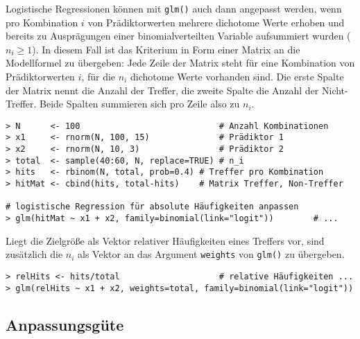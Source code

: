 Logistische Regressionen können mit \lstinline!glm()! auch dann angepasst werden, wenn pro Kombination $i$ von Prädiktorwerten mehrere dichotome Werte erhoben und bereits zu Ausprägungen einer binomialverteilten Variable aufsummiert wurden ($n_{i} \geq 1$). In diesem Fall ist das Kriterium in Form einer Matrix an die Modellformel zu übergeben: Jede Zeile der Matrix steht für eine Kombination von Prädiktorwerten $i$, für die $n_{i}$ dichotome Werte vorhanden sind. Die erste Spalte der Matrix nennt die Anzahl der Treffer, die zweite Spalte die Anzahl der Nicht-Treffer. Beide Spalten summieren sich pro Zeile also zu $n_{i}$.
\begin{lstlisting}
> N      <- 100                            # Anzahl Kombinationen
> x1     <- rnorm(N, 100, 15)              # Prädiktor 1
> x2     <- rnorm(N, 10, 3)                # Prädiktor 2
> total  <- sample(40:60, N, replace=TRUE) # n_i
> hits   <- rbinom(N, total, prob=0.4) # Treffer pro Kombination
> hitMat <- cbind(hits, total-hits)    # Matrix Treffer, Non-Treffer

# logistische Regression für absolute Häufigkeiten anpassen
> glm(hitMat ~ x1 + x2, family=binomial(link="logit"))        # ...
\end{lstlisting}

Liegt die Zielgröße als Vektor relativer Häufigkeiten eines Treffers vor, sind zusätzlich die $n_{i}$ als Vektor an das Argument \lstinline!weights! von \lstinline!glm()! zu übergeben.
\begin{lstlisting}
> relHits <- hits/total                    # relative Häufigkeiten ...
> glm(relHits ~ x1 + x2, weights=total, family=binomial(link="logit"))
\end{lstlisting}

\subsection{Anpassungsgüte}
\label{sec:regrLogRsq}

